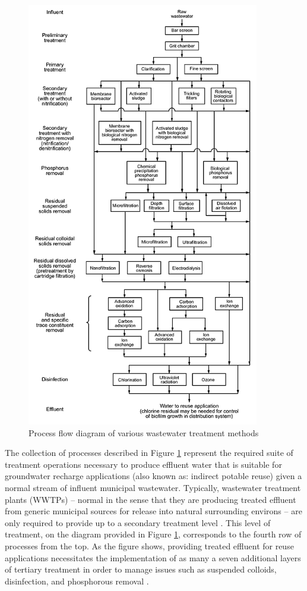     \begin{figure}[!h]
       \centering
       \includegraphics[width=4in]{figures/process-flow.png}
       \caption[Process Flow Diagram of Wastewater Treatment Methods]{Process flow diagram of various wastewater treatment methods \cite{Asano2007}}
       \label{fig:process-flow-diagram}
     \end{figure}

The collection of processes described in Figure \ref{fig:process-flow-diagram} represent the required suite of treatment operations necessary to produce effluent water that is suitable for groundwater recharge applications (also known as: indirect potable reuse) given a normal stream of influent municipal wastewater. Typically, wastewater treatment plants (WWTPs) -- normal in the sense that they are producing treated effluent from generic municipal sources for release into natural surrounding environs -- are only required to provide up to a secondary treatment level \cite{Asano2007}. This level of treatment, on the diagram provided in Figure \ref{fig:process-flow-diagram}, corresponds to the fourth row of processes from the top. As the figure shows, providing treated effluent for reuse applications necessitates the implementation of as many a seven additional layers of tertiary treatment in order to manage issues such as suspended colloids, disinfection, and phosphorous removal \cite{Tchobanoglous2003}.

